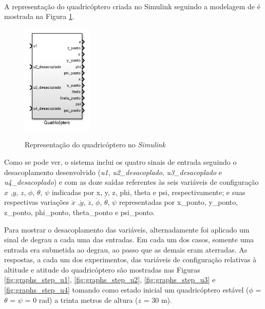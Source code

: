 A representação do quadricóptero criada no Simulink\textsuperscript{\textregistered} seguindo a modelagem de  é mostrada na Figura \ref{fig:diagram_drone_block}. 

\begin{figure}[!htb]
    \centering
    \caption{Representação do quadricóptero no \textit{Simulink}}
    \includegraphics[width=0.3\textwidth]{./04-figuras/figuras_pos_banca/1-mostrando_desacoplamento/diagram_drone_block}
    \label{fig:diagram_drone_block}
\end{figure}
Como se pode ver, o sistema inclui os quatro sinais de entrada seguindo o desacoplamento desenvolvido (\textit{u1}, \textit{u2\_desacoplado}, \textit{u3\_desacoplado} e \textit{u4\_desacoplado}) e com as doze saídas referentes às seis variáveis de configuração $x$ ,$y$, $z$, $\phi$, $\theta$, $\psi$ indicadas por x, y, z, phi, theta e psi, respectivamente; e suas respectivas variações $\dot{x}$ ,$\dot{y}$, $\dot{z}$, $\dot{\phi}$, $\dot{\theta}$, $\dot{\psi}$ representadas por x\_ponto, y\_ponto, z\_ponto, phi\_ponto, theta\_ponto e psi\_ponto.

Para mostrar o desacoplamento das variáveis, alternadamente foi aplicado um sinal de degrau a cada uma das entradas. Em cada um dos casos, somente uma entrada era submetida ao degrau, ao passo que as demais eram aterradas. As respostas, a cada um dos experimentos, das variáveis de configuração relativas à altitude e atitude do quadricóptero são mostradas nas Figuras \ref{fig:graphs_step_u1}, \ref{fig:graphs_step_u2}, \ref{fig:graphs_step_u3} e \ref{fig:graphs_step_u4} tomando como estado inicial um quadricóptero estável ($\phi$ = $\theta$ = $\psi$ = 0 rad) a trinta metros de altura ($z$ = 30 m).

